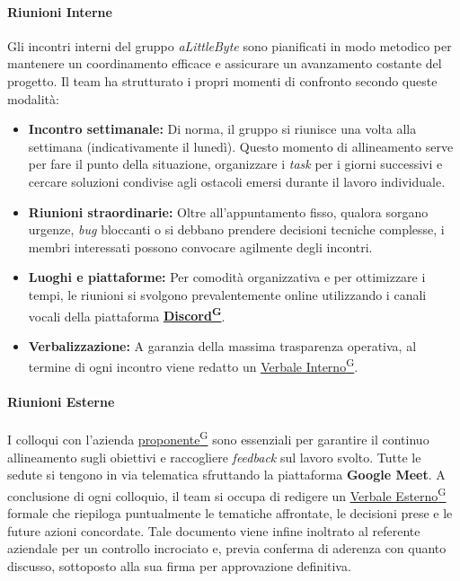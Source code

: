 \documentclass[a4paper,12pt]{article}
\providecommand{\glslink}[2]{\href{https://alittlebyte-19.github.io/Documentazione/glossario.html\#gls-#1}{\underline{#2}\textsuperscript{\scriptsize G}}}
\begin{document}
\paragraph{Riunioni Interne}
Gli incontri interni del gruppo \textit{aLittleByte} sono pianificati in modo metodico per mantenere un coordinamento efficace e assicurare un avanzamento costante del progetto. Il team ha strutturato i propri momenti di confronto secondo queste modalità:

\begin{itemize}
    \item \textbf{Incontro settimanale:} Di norma, il gruppo si riunisce una volta alla settimana (indicativamente il lunedì). Questo momento di allineamento serve per fare il punto della situazione, organizzare i \textit{task} per i giorni successivi e cercare soluzioni condivise agli ostacoli emersi durante il lavoro individuale.
    
    \item \textbf{Riunioni straordinarie:} Oltre all'appuntamento fisso, qualora sorgano urgenze, \textit{bug} bloccanti o si debbano prendere decisioni tecniche complesse, i membri interessati possono convocare agilmente degli incontri.
    
    \item \textbf{Luoghi e piattaforme:} Per comodità organizzativa e per ottimizzare i tempi, le riunioni si svolgono prevalentemente online utilizzando i canali vocali della piattaforma \textbf{\glslink{discord}{Discord}}.
    
    \item \textbf{Verbalizzazione:} A garanzia della massima trasparenza operativa, al termine di ogni incontro viene redatto un \glslink{verbale-interno}{Verbale Interno}.
\end{itemize}

\paragraph{Riunioni Esterne}

I colloqui con l'azienda \glslink{committente-proponente}{proponente} sono essenziali per garantire il continuo allineamento sugli obiettivi e raccogliere \textit{feedback} sul lavoro svolto.
Tutte le sedute si tengono in via telematica sfruttando la piattaforma \textbf{Google Meet}. A conclusione di ogni colloquio, il team si occupa di redigere un \glslink{verbale-esterno}{Verbale Esterno} formale che riepiloga puntualmente le tematiche affrontate, le decisioni prese e le future azioni concordate. Tale documento viene infine inoltrato al referente aziendale per un controllo incrociato e, previa conferma di aderenza con quanto discusso, sottoposto alla sua firma per approvazione definitiva.
\end{document}
